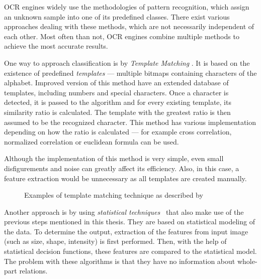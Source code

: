 OCR engines widely use the methodologies of pattern recognition, which assign an unknown sample into one of its predefined classes. There exist various approaches dealing with these methods, which are not necessarily independent of each other. Most often than not, OCR engines combine multiple methods to achieve the most accurate results.

One way to approach classification is by \emph{Template Matching} \citep{templateMatching}. It is based on the existence of predefined \emph{templates} --- multiple bitmaps containing characters of the alphabet. Improved version of this method have an extended database of templates, including numbers and special characters. Once a character is detected, it is passed to the algorithm and for every existing template, its similarity ratio is calculated. The template with the greatest ratio is then assumed to be the recognized character. This method has various implementation depending on how the ratio is calculated --- for example cross correlation, normalized correlation or euclidean formula can be used.

Although the implementation of this method is very simple, even small disfigurements and noise can greatly affect its efficiency. Also, in this case, a feature extraction would be unnecessary as all templates are created manually.

\begin{figure}[H]
    \noindent
	\caption{Examples of template matching technique as described by \citet{Ning1993AnIO}}
	\label{fig:mff}
\end{figure}

Another approach is by using \emph{statistical techniques}~\citep{characterClassification} that also make use of the previous steps mentioned in this thesis. They are based on statistical modeling of the data. To determine the output, extraction of the features from input image (such as size, shape, intensity) is first performed. Then, with the help of statistical decision functions, these features are compared to the statistical model. The problem with these algorithms is that they have no information about whole-part relations. 

